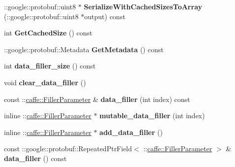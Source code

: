 \begin{DoxyCompactItemize}
\+::google\+::protobuf\+::uint8 $\ast$ {\bfseries Serialize\+With\+Cached\+Sizes\+To\+Array} (\+::google\+::protobuf\+::uint8 $\ast$output) const
\item 
\mbox{\label{classcaffe_1_1_dummy_data_parameter_a6a6a9ce8f36450898e7ad16e342db6e2}} 
int {\bfseries Get\+Cached\+Size} () const
\item 
\mbox{\label{classcaffe_1_1_dummy_data_parameter_a2c6609f6e9b1d48d4f027289faf958f2}} 
\+::google\+::protobuf\+::\+Metadata {\bfseries Get\+Metadata} () const
\item 
\mbox{\label{classcaffe_1_1_dummy_data_parameter_ac04580d29b2bec667dd06c3809708bd6}} 
int {\bfseries data\+\_\+filler\+\_\+size} () const
\item 
\mbox{\label{classcaffe_1_1_dummy_data_parameter_a69241a92147d63f7294a72c50f3a65b1}} 
void {\bfseries clear\+\_\+data\+\_\+filler} ()
\item 
\mbox{\label{classcaffe_1_1_dummy_data_parameter_aca59828db9f48da93d907241d0d8d5e2}} 
const \+::\mbox{\hyperlink{classcaffe_1_1_filler_parameter}{caffe\+::\+Filler\+Parameter}} \& {\bfseries data\+\_\+filler} (int index) const
\item 
\mbox{\label{classcaffe_1_1_dummy_data_parameter_a41126058c600aa1943f4b6e06a23ab18}} 
inline \+::\mbox{\hyperlink{classcaffe_1_1_filler_parameter}{caffe\+::\+Filler\+Parameter}} $\ast$ {\bfseries mutable\+\_\+data\+\_\+filler} (int index)
\item 
\mbox{\label{classcaffe_1_1_dummy_data_parameter_a680cfde34311b60db7b16e20b0564971}} 
inline \+::\mbox{\hyperlink{classcaffe_1_1_filler_parameter}{caffe\+::\+Filler\+Parameter}} $\ast$ {\bfseries add\+\_\+data\+\_\+filler} ()
\item 
\mbox{\label{classcaffe_1_1_dummy_data_parameter_a6fe040bf84beaf2b38614a4735fb13ce}} 
const \+::google\+::protobuf\+::\+Repeated\+Ptr\+Field$<$ \+::\mbox{\hyperlink{classcaffe_1_1_filler_parameter}{caffe\+::\+Filler\+Parameter}} $>$ \& {\bfseries data\+\_\+filler} () const

\end{DoxyCompactItemize}

